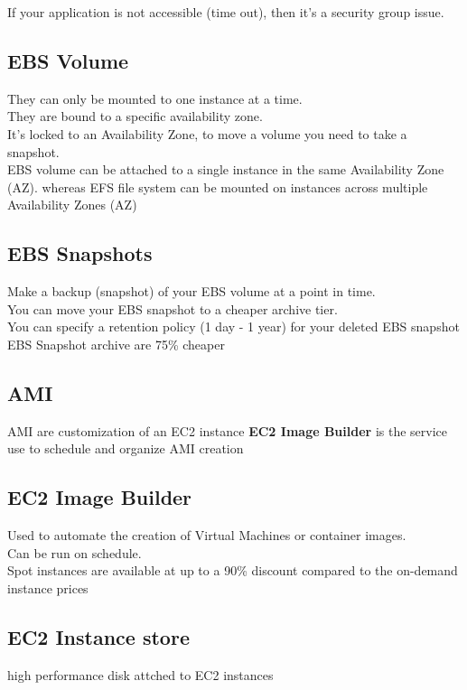 \documentclass[12pt, letterpaper, twoside]{article}
\begin{document}
If your application is not accessible (time out), then it’s a security group issue.\\

\subsection{EBS Volume}
They can only be mounted to one instance at a time.\\
They are bound to a specific availability zone.\\
It’s locked to an Availability Zone, to move a volume you need to take a snapshot.\\
EBS volume can be attached to a single instance in the same Availability Zone (AZ).
whereas EFS file system can be mounted on instances across multiple Availability Zones (AZ)

\subsection{EBS Snapshots}
Make a backup (snapshot) of your EBS volume at a point in time.\\
You can move your EBS snapshot to a cheaper archive tier.\\
You can specify a retention policy (1 day - 1 year) for your deleted EBS snapshot\\
EBS Snapshot archive are 75\% cheaper\\

\subsection{AMI}
AMI are customization of an EC2 instance
\textbf{EC2 Image Builder} is the service use to schedule and organize AMI creation

\subsection{EC2 Image Builder}
Used to automate the creation of Virtual Machines or container images.\\
Can be run on schedule.\\
Spot instances are available at up to a 90\% discount compared to the on-demand instance prices

\subsection{EC2 Instance store}
high performance disk attched to EC2 instances
\end{document}
